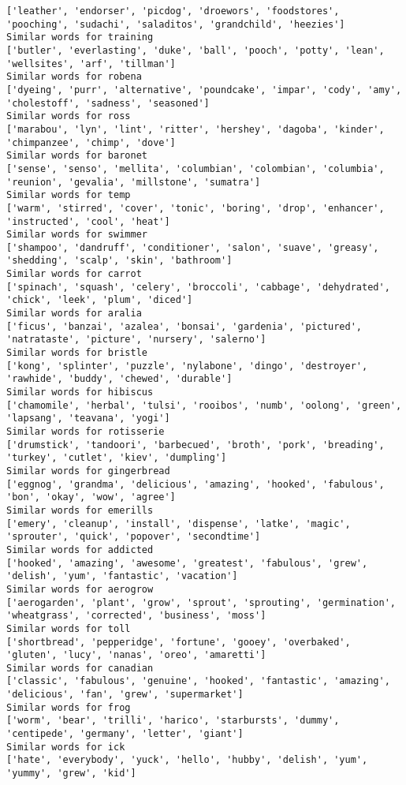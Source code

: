 \documentclass[11pt]{article}
\begin{document}
\begin{Verbatim}[commandchars=\\\{\}]
['leather', 'endorser', 'picdog', 'droewors', 'foodstores', 'pooching', 'sudachi', 'saladitos', 'grandchild', 'heezies']
Similar words for training
['butler', 'everlasting', 'duke', 'ball', 'pooch', 'potty', 'lean', 'wellsites', 'arf', 'tillman']
Similar words for robena
['dyeing', 'purr', 'alternative', 'poundcake', 'impar', 'cody', 'amy', 'cholestoff', 'sadness', 'seasoned']
Similar words for ross
['marabou', 'lyn', 'lint', 'ritter', 'hershey', 'dagoba', 'kinder', 'chimpanzee', 'chimp', 'dove']
Similar words for baronet
['sense', 'senso', 'mellita', 'columbian', 'colombian', 'columbia', 'reunion', 'gevalia', 'millstone', 'sumatra']
Similar words for temp
['warm', 'stirred', 'cover', 'tonic', 'boring', 'drop', 'enhancer', 'instructed', 'cool', 'heat']
Similar words for swimmer
['shampoo', 'dandruff', 'conditioner', 'salon', 'suave', 'greasy', 'shedding', 'scalp', 'skin', 'bathroom']
Similar words for carrot
['spinach', 'squash', 'celery', 'broccoli', 'cabbage', 'dehydrated', 'chick', 'leek', 'plum', 'diced']
Similar words for aralia
['ficus', 'banzai', 'azalea', 'bonsai', 'gardenia', 'pictured', 'natrataste', 'picture', 'nursery', 'salerno']
Similar words for bristle
['kong', 'splinter', 'puzzle', 'nylabone', 'dingo', 'destroyer', 'rawhide', 'buddy', 'chewed', 'durable']
Similar words for hibiscus
['chamomile', 'herbal', 'tulsi', 'rooibos', 'numb', 'oolong', 'green', 'lapsang', 'teavana', 'yogi']
Similar words for rotisserie
['drumstick', 'tandoori', 'barbecued', 'broth', 'pork', 'breading', 'turkey', 'cutlet', 'kiev', 'dumpling']
Similar words for gingerbread
['eggnog', 'grandma', 'delicious', 'amazing', 'hooked', 'fabulous', 'bon', 'okay', 'wow', 'agree']
Similar words for emerills
['emery', 'cleanup', 'install', 'dispense', 'latke', 'magic', 'sprouter', 'quick', 'popover', 'secondtime']
Similar words for addicted
['hooked', 'amazing', 'awesome', 'greatest', 'fabulous', 'grew', 'delish', 'yum', 'fantastic', 'vacation']
Similar words for aerogrow
['aerogarden', 'plant', 'grow', 'sprout', 'sprouting', 'germination', 'wheatgrass', 'corrected', 'business', 'moss']
Similar words for toll
['shortbread', 'pepperidge', 'fortune', 'gooey', 'overbaked', 'gluten', 'lucy', 'nanas', 'oreo', 'amaretti']
Similar words for canadian
['classic', 'fabulous', 'genuine', 'hooked', 'fantastic', 'amazing', 'delicious', 'fan', 'grew', 'supermarket']
Similar words for frog
['worm', 'bear', 'trilli', 'harico', 'starbursts', 'dummy', 'centipede', 'germany', 'letter', 'giant']
Similar words for ick
['hate', 'everybody', 'yuck', 'hello', 'hubby', 'delish', 'yum', 'yummy', 'grew', 'kid']

\end{Verbatim}
\end{document}
